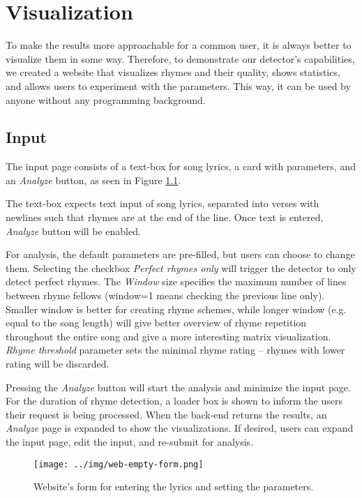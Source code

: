 \chapter{Visualization}\label{visualization}
To make the results more approachable for a common user, it is always better to visualize them in some way. Therefore, to demonstrate our detector's capabilities, we created a website that visualizes rhymes and their quality, shows statistics, and allows users to experiment with the parameters. This way, it can be used by anyone without any programming background.

\section{Input}
The input page consists of a text-box for song lyrics, a card with parameters, and an \textit{Analyze} button, as seen in Figure \ref{web-form}.

The text-box expects text input of song lyrics, separated into verses with newlines such that rhymes are at the end of the line. Once text is entered, \textit{Analyze} button will be enabled.

For analysis, the default parameters are pre-filled, but users can choose to change them. Selecting the checkbox \textit{Perfect rhymes only} will trigger the detector to only detect perfect rhymes. The \textit{Window} size specifies the maximum number of lines between rhyme fellows (window=1 means checking the previous line only). Smaller window is better for creating rhyme schemes, while longer window (e.g. equal to the song length) will give better overview of rhyme repetition throughout the entire song and give a more interesting matrix visualization. \textit{Rhyme threshold} parameter sets the minimal rhyme rating -- rhymes with lower rating will be discarded.

Pressing the \textit{Analyze} button will start the analysis and minimize the input page. For the duration of rhyme detection, a loader box is shown to inform the users their request is being processed. When the back-end returns the results, an \textit{Analyze} page is expanded to show the visualizations. If desired, users can expand the input page, edit the input, and re-submit for analysis.

\begin{figure}[h]\centering
	\texttt{[image: ../img/web-empty-form.png]}
	\caption{Website's form for entering the lyrics and setting the parameters.}
	\label{web-form}
\end{figure}

